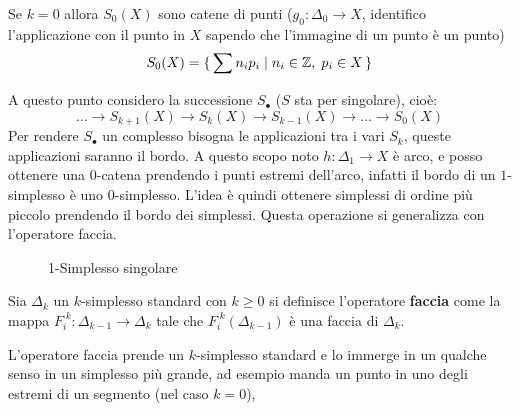 \begin{example}[$ k = 0$]
  Se $ k = 0 $ allora $ S_0(X) $ sono catene di punti ($ g_0 : \Delta_0 \to X $,
  identifico l'applicazione con il punto in $ X $ sapendo che l'immagine di un
  punto è un punto)
  \[
    S_0(X) = \set { \sum n_i p_i | n_i \in \mathbb{Z}, \; p_i \in X}
  \]
\end{example}

A questo punto considero la successione $ S_\bullet $ ($ S $ sta per singolare), cioè:
\[
  \dots \to S_{k+1}(X) \to S_k(X) \to S_{k-1}(X) \to \dots \to S_0(X)
\]
Per rendere $ S_\bullet $ un complesso bisogna le applicazioni tra i vari
$ S_k $, queste applicazioni saranno il bordo. A questo scopo noto
$ h: \Delta_1 \to X $ è arco, e posso ottenere una $ 0 $-catena prendendo i punti
estremi dell'arco, infatti il bordo di un $ 1 $-simplesso è uno $ 0 $-simplesso.
L'idea è quindi ottenere simplessi di ordine più piccolo prendendo il bordo dei
simplessi. Questa operazione si generalizza con l'operatore faccia.

\begin{figure}[htbp]
  \centering
  \caption{1-Simplesso singolare}
  \label{fig:lez1:1_standard_simplex_with_arc}
\end{figure}

\begin{definition}
  Sia $ \Delta_k $ un $ k $-simplesso standard con $ k \geq 0 $ si definisce l'operatore \textbf{faccia}
  come la mappa $ F_i^{\;k}: \Delta_{k-1} \to \Delta_k $ tale che $ F_i^{\;k}(\Delta_{k-1}) $ è una faccia di $ \Delta_k $.
\end{definition}
L'operatore faccia prende un $ k $-simplesso standard e lo immerge in un qualche senso in un
simplesso più grande, ad esempio manda un punto in uno degli estremi di un segmento (nel caso $ k = 0 $),

